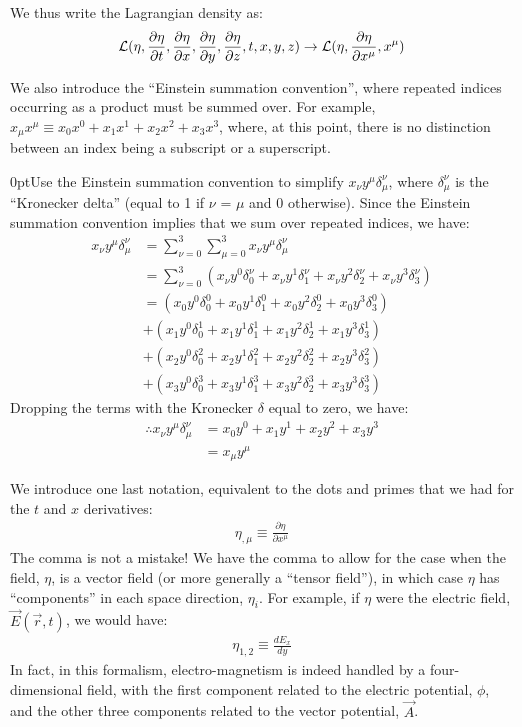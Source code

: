 We thus write the Lagrangian density as:
\begin{align}
\mathcal{L}(\eta,\frac{\partial\eta}{\partial t},\frac{\partial\eta}{\partial x},\frac{\partial\eta}{\partial y},\frac{\partial\eta}{\partial z},t,x,y,z)\to\mathcal{L}(\eta,\frac{\partial\eta}{\partial x^\mu},x^\mu)
\end{align}

We also introduce the ``Einstein summation convention'', where repeated indices occurring as a product must be summed over. For example, $x_\mu x^\mu\equiv x_0x^0+x_1x^1+x_2x^2+x_3x^3$, where, at this point, there is no distinction between an index being a subscript or a superscript.

\begin{example}{0pt}{Use the Einstein summation convention to simplify $x_\nu y^\mu \delta^\nu_\mu$, where $\delta^\nu_\mu$ is the ``Kronecker delta'' (equal to 1 if $\nu$ = $\mu$ and 0 otherwise). }{}
Since the Einstein summation convention implies that we sum over repeated indices, we have:
\begin{align*}
x_\nu y^\mu \delta^\nu_\mu&=\sum_{\nu=0}^3\sum_{\mu=0}^3x_\nu y^\mu \delta^\nu_\mu\\
&=\sum_{\nu=0}^3(x_\nu y^0 \delta^\nu_0+ x_\nu y^1 \delta^\nu_1+x_\nu y^2 \delta^\nu_2+x_\nu y^3 \delta^\nu_3 )\\
&=(x_0 y^0 \delta^0_0+ x_0 y^1 \delta^0_1+x_0 y^2 \delta^0_2+x_0 y^3 \delta^0_3)\\
&+(x_1 y^0 \delta^1_0+ x_1 y^1 \delta^1_1+x_1 y^2 \delta^1_2+x_1 y^3 \delta^1_3)\\
&+(x_2 y^0 \delta^2_0+ x_2 y^1 \delta^2_1+x_2 y^2 \delta^2_2+x_2 y^3 \delta^2_3)\\
&+(x_3 y^0 \delta^3_0+ x_3 y^1 \delta^3_1+x_3 y^2 \delta^3_2+x_3 y^3 \delta^3_3)
\end{align*}
Dropping the terms with the Kronecker $\delta$ equal to zero, we have:
\begin{align*}
\therefore x_\nu y^\mu \delta^\nu_\mu&=x_0y^0+x_1y^1+x_2y^2+x_3y^3\\
&=x_\mu y^\mu
\end{align*}

\end{example}

We introduce one last notation, equivalent to the dots and primes that we had for the $t$ and $x$ derivatives:
\begin{align}
\eta_{,\mu}\equiv\frac{\partial\eta}{\partial x^\mu}
\end{align}
The comma is not a mistake! We have the comma to allow for the case when the field, $\eta$, is a vector field (or more generally a ``tensor field''), in which case $\eta$ has ``components'' in each space direction, $\eta_i$. For example, if $\eta$ were the electric field, $\vec E(\vec r,t)$, we would have:
\begin{align}
\eta_{1,2}\equiv\frac{dE_x}{dy}
\end{align}
In fact, in this formalism, electro-magnetism is indeed handled by a four-dimensional field, with the first component related to the electric potential, $\phi$, and the other three components related to the vector potential, $\vec A$.

